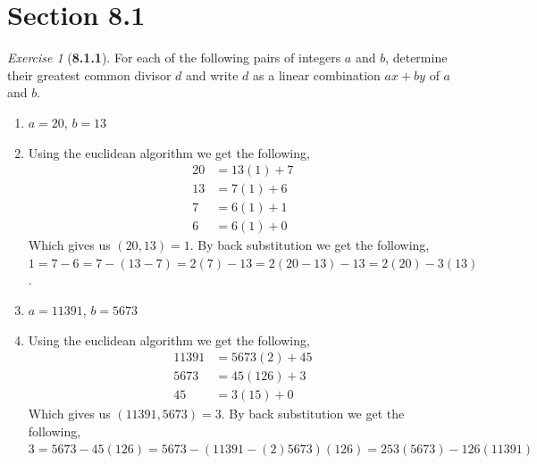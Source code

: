 \documentclass[12pt]{amsart}
\makeatletter
\theoremstyle{remark}
\newtheorem*{exercise}{Exercise}%
\renewenvironment{proof}[1][\proofname]{\par\doublespacing
  \pushQED{\qed}%
  \normalfont \topsep6\p@\@plus6\p@\relax
  \list{}{%
    \settowidth{\leftmargin}{\itshape\proofname:\hskip\labelsep}%
    \setlength{\labelwidth}{0pt}%
    \setlength{\itemindent}{-\leftmargin}%
  }%
  \item[\hskip\labelsep\itshape#1\@addpunct{:}]\ignorespaces
}{%
  \popQED\endlist\@endpefalse
  \singlespacing
}
\theoremstyle{mycomment}
\makeatother
\begin{document}
\section*{\textbf{Section 8.1}}

\begin{exercise}[\textbf{8.1.1}] For each of the following pairs of integers $a$ and $b$, determine their greatest common divisor $d$
  and write $d$ as a linear combination $ax + by$ of $a$ and $b$. 
  \begin{enumerate}
    \item[a.] $a = 20$, $b = 13$ 
    \begin{proof} Using the euclidean algorithm we get the following, 
      \begin{align*}
        20 &= 13(1) + 7\\
        13 &= 7(1) + 6\\
        7 &= 6(1) + 1\\
        6 &= 6(1) + 0
      \end{align*}
      Which gives us $(20, 13) = 1$. By back substitution we get the following, $1 = 7 - 6 = 7 - (13 - 7) = 2(7) - 13 = 2(20 - 13) - 13 = 2(20) - 3(13)$.
    \end{proof}
    \vspace{.15in}


    \item[c.] $a = 11391$, $b = 5673$
    \begin{proof} Using the euclidean algorithm we get the following, 
      \begin{align*}
        11391 &= 5673(2) + 45\\
      5673 &= 45(126) + 3\\
        45 &= 3(15) + 0
      \end{align*}
      Which gives us $(11391, 5673) = 3$. By back substitution we get the following, $3 = 5673 - 45(126) = 5673 - (11391 - (2)5673)(126) = 253(5673) - 126(11391)$
    \end{proof}
    \vspace{.15in}




\end{enumerate}
\end{exercise}
\end{document}
